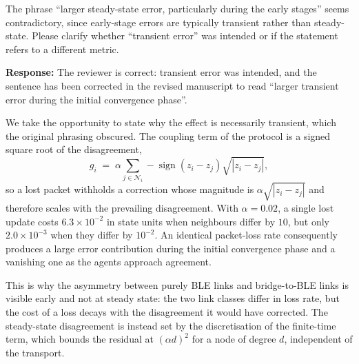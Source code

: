 \item The phrase ``larger steady-state error, particularly during the early
stages'' seems contradictory, since early-stage errors are typically transient
rather than steady-state. Please clarify whether ``transient error'' was intended
or if the statement refers to a different metric.

\textbf{Response:} The reviewer is correct: transient error was intended, and the
sentence has been corrected in the revised manuscript to read ``larger transient
error during the initial convergence phase''.

We take the opportunity to state why the effect is necessarily transient, which
the original phrasing obscured. The coupling term of the protocol is a signed
square root of the disagreement,
\[
  g_i \;=\; \alpha \sum_{j \in \mathcal{N}_i}
            -\operatorname{sign}(z_i - z_j)\sqrt{|z_i - z_j|},
\]
so a lost packet withholds a correction whose magnitude is
$\alpha\sqrt{|z_i - z_j|}$ and therefore scales with the prevailing disagreement.
With $\alpha = 0.02$, a single lost update costs $6.3\times10^{-2}$ in state units
when neighbours differ by $10$, but only $2.0\times10^{-3}$ when they differ by
$10^{-2}$. An identical packet-loss rate consequently produces a large error
contribution during the initial convergence phase and a vanishing one as the
agents approach agreement.

This is why the asymmetry between purely BLE links and bridge-to-BLE links is
visible early and not at steady state: the two link classes differ in loss rate,
but the cost of a loss decays with the disagreement it would have corrected. The
steady-state disagreement is instead set by the discretisation of the
finite-time term, which bounds the residual at $(\alpha d)^2$ for a node of
degree $d$, independent of the transport.

